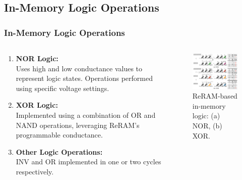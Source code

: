 \documentclass[
	12pt, %
]{beamer}
\begin{document}
\subsection{In-Memory Logic Operations}
\begin{frame}
	\frametitle{In-Memory Logic Operations}
	\begin{columns}
		\begin{column}{0.5\textwidth}
			\begin{enumerate}
				\item 
				\textbf{NOR Logic:}\\ Uses high and low conductance values to represent logic states. Operations performed using specific voltage settings.
				
				\item 
				\textbf{XOR Logic:}\\ Implemented using a combination of OR and NAND operations, leveraging ReRAM's programmable conductance.
				
				\item 
				\textbf{Other Logic Operations:}\\ INV and OR implemented in one or two cycles respectively.
			\end{enumerate}
		\end{column}
		
		\begin{column}{0.5\textwidth}
			\begin{figure}
				\includegraphics[width=6.3cm]{Images/img3.png}
				\caption{ReRAM-based in-memory logic: (a) NOR, (b) XOR.}
			\end{figure}
		\end{column}
	\end{columns}		
\end{frame}
\end{document}
